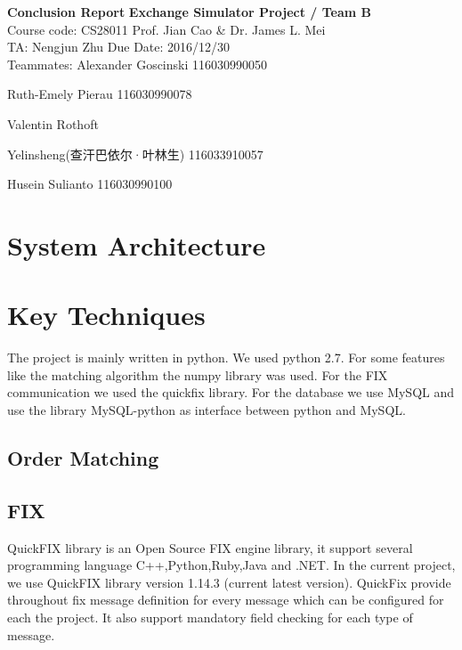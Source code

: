 \documentclass[a4paper, 11pt]{article}
\begin{document}
\noindent

\large\textbf{Conclusion Report}
\hfill \textbf{Exchange Simulator Project / Team B} \\

\normalsize Course code: CS28011 \hfill Prof. Jian Cao \& Dr. James L. Mei\\

TA: Nengjun Zhu  \hfill Due Date: 2016/12/30 \\

Teammates:
Alexander Goscinski 116030990050

Ruth-Emely Pierau 116030990078

Valentin Rothoft

Yelinsheng(查汗巴依尔·叶林生) 116033910057

Husein Sulianto 116030990100



\section*{System Architecture}

\section*{Key Techniques}

The project is mainly written in python. We used python 2.7. For some features like the matching algorithm the numpy library \cite{numpy} was used.
For the FIX communication we used the quickfix library. For the database we use MySQL and use the library MySQL-python as interface between python and MySQL.
\subsection*{Order Matching}

\subsection*{FIX}
QuickFIX library is an Open Source FIX engine library, it support several programming language C++,Python,Ruby,Java and .NET. 
In the current project, we use QuickFIX library version 1.14.3 (current latest version). QuickFix provide throughout fix message definition for every message which can be configured for each the project.
It also support mandatory field checking for each type of message.
\end{document}
